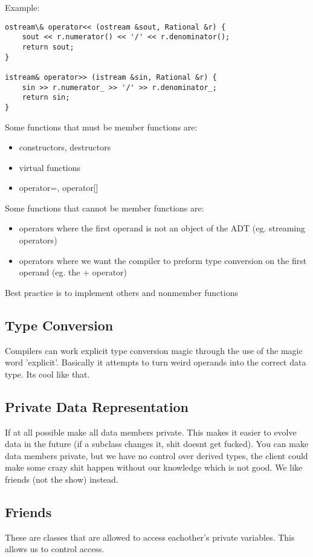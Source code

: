 \documentclass[12pt]{article}
\begin{document}
Example:
\begin{verbatim}
ostream\& operator<< (ostream &sout, Rational &r) {
    sout << r.numerator() << '/' << r.denominator();
    return sout;
}

istream& operator>> (istream &sin, Rational &r) {
    sin >> r.numerator_ >> '/' >> r.denominator_;
    return sin;
}
\end{verbatim}

Some functions that must be member functions are:
\begin{itemize}
\item constructors, destructors
\item virtual functions
\item operator=, operator[]
\end{itemize}
Some functions that cannot be member functions are:
\begin{itemize}
\item operators where the first operand is not an object of the ADT (eg. streaming operators)
\item operators where we want the compiler to preform type conversion on the first operand (eg. the + operator)
\end{itemize}
Best practice is to implement others and nonmember functions

\subsection*{Type Conversion}
Compilers can work explicit type conversion magic through the use of the magic word 'explicit'. Basically it attempts to turn weird operands into the correct data type. Its cool like that.

\subsection*{Private Data Representation}
If at all possible make all data members private. This makes it easier to evolve data in the future (if a subclass changes it, shit doesnt get fucked). You can make data members private, but we have no control over derived types, the client could make some crazy shit happen without our knowledge which is not good. We like friends (not the show) instead.

\subsection*{Friends}
These are classes that are allowed to access eachother's private variables. This allows us to control access.
\end{document}
